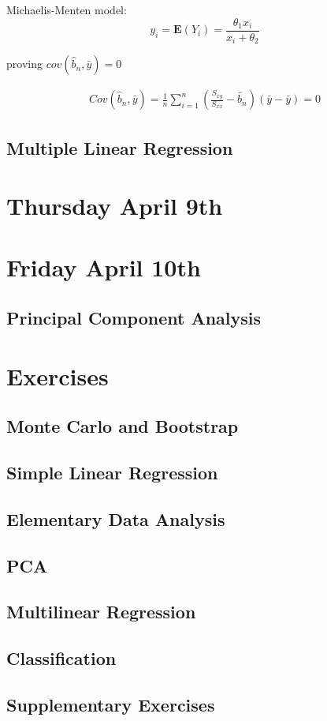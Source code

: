 \documentclass[11pt]{article}
\begin{document}
Michaelis-Menten model:
\begin{equation}
    y_i = \textbf{E}(Y_i) = \frac{\theta_1 x_i}{x_i + \theta_2}
\end{equation}

proving $cov(\hat{b}_n, \bar{y}) = 0$

\begin{gather}
    Cov(\hat{b}_n, \bar{y}) = \frac{1}{n} \sum_{i=1}^{n} (\frac{S_{xy}}{S_{xx}} - \bar{b}_n)(\bar{y} - \bar{y}) = 0
\end{gather}

\subsection{Multiple Linear Regression}

\section{Thursday April 9th}

\section{Friday April 10th}
\subsection{Principal Component Analysis}

\section{Exercises}
\subsection{Monte Carlo and Bootstrap}

\subsection{Simple Linear Regression}

\subsection{Elementary Data Analysis}

\subsection{PCA}

\subsection{Multilinear Regression}

\subsection{Classification}

\subsection{Supplementary Exercises}
\end{document}
